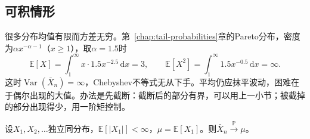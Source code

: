 \subsection{可积情形}
\label{sec:lln-wlln-integrable}

很多分布均值有限而方差无穷。第~\ref{chap:tail-probabilities}章的Pareto分布，密度为$\alpha x^{-\alpha-1}$（$x\geq1$），取$\alpha=1.5$时
\[
 \mathbb{E}[X]=\int_1^{\infty}x\cdot1.5x^{-2.5}\,\mathrm{d}x=3,\qquad \mathbb{E}[X^2]=\int_1^{\infty}1.5x^{-0.5}\,\mathrm{d}x=\infty .
\]
这时$\operatorname{Var}(\bar{X}_n)=\infty$，Chebyshev不等式无从下手。平均仍应抹平波动，困难在于偶尔出现的大值。办法是先截断：截断后的部分有界，可以用上一小节；被截掉的部分出现得少，用一阶矩控制。

\begin{theorem}[可积情形的弱大数律]
\label{thm:lln-wlln-integrable}
设$X_1,X_2,\dots$独立同分布，$\mathbb{E}[\lvert X_1\rvert]<\infty$，$\mu=\mathbb{E}[X_1]$。则$\bar{X}_n\xrightarrow{\mathbb{P}}\mu$。
\end{theorem}

